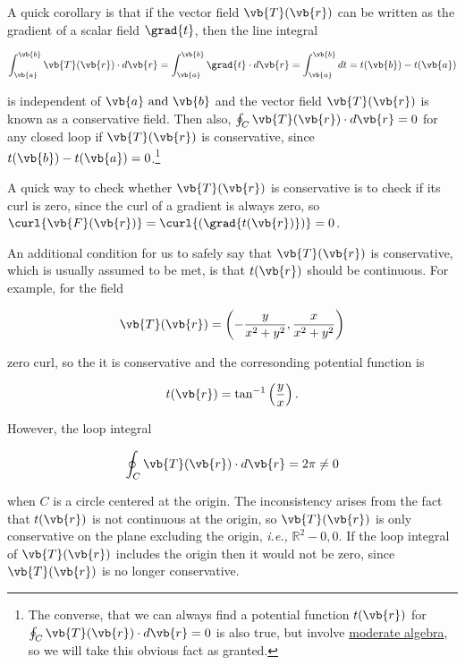 \documentclass[english,a4paper,12pt]{report}
\begin{document}
A quick corollary is that if the vector field \(\vb{T} (\vb{r} )\) can be written as the gradient of a scalar field \(\grad{t}  \), then the line integral 

\begin{equation}
	\int_{\vb{a} }^{\vb{b} } \vb{T}(\vb{r} ) \cdot  d\vb{r}  = \int_{\vb{a} }^{\vb{b} } \grad{t} \cdot d\vb{r} = \int_{\vb{a} }^{\vb{b} }dt = t(\vb{b} ) - t(\vb{a} )
\end{equation}

is independent of \(\vb{a} \text { and } \vb{b} \) and the vector field \(\vb{T} (\vb{r} )\) is known as a conservative field. Then also, \(\oint_{C} \vb{T} (\vb{r} ) \cdot d\vb{r} = 0\) for any closed loop if \(\vb{T} (\vb{r} )\) is conservative, since \(t(\vb{b}) - t(\vb{a}) = 0\).\footnote{The converse, that we can always find a potential function \(t(\vb{r} )\) for \(\oint_{C}\vb{T} (\vb{r} )\cdot d\vb{r}  =0\) is also true, but involve \href{https:////www.damtp.cam.ac.uk//user//tong//vc//vc.pdf}{moderate algebra}, so we will take this obvious fact as granted.  } 

A quick way to check whether \(\vb{T} (\vb{r} )\) is conservative is to check if its curl is zero, since the curl of a gradient is always zero, so \(\curl{\vb{F} (\vb{r} )} = \curl{(\grad{t(\vb{r} )} )} =0 \).

An additional condition for us to safely say that \(\vb{T} (\vb{r} )\) is conservative, which is usually assumed to be met, is that \(t(\vb{r} )\) should be continuous. For example, for the field

\begin{equation}
	\vb{T} (\vb{r} ) = \left( -\frac{y}{x^2+y^2}, \frac{x}{x^2+y^2}   \right)
\end{equation}

zero curl, so the it is conservative and the corresonding potential function is 

\begin{equation}
	t(\vb{r} ) = \tan ^{-1} \left( \frac{y}{x}  \right).
\end{equation}

However, the loop integral 

\begin{equation}
	\oint_{C} \vb{T} (\vb{r} ) \cdot d\vb{r} = 2\pi \neq 0
\end{equation}

when \(C\) is a circle centered at the origin. The inconsistency arises from the fact that \(t(\vb{r} )\) is not continuous at the origin, so \(\vb{T} (\vb{r} )\) is only conservative on the plane excluding the origin, \textit{i.e.,} \(\mathbb{R}^2 - {0,0}\). If the loop integral of \(\vb{T} (\vb{r} )\) includes the origin then it would not be zero, since \(\vb{T} (\vb{r} )\) is no longer conservative. 
\end{document}

